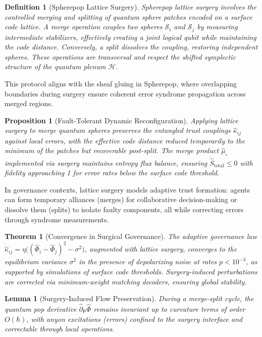 \documentclass[12pt]{article}
\newtheorem{definition}{Definition}
\newtheorem{proposition}{Proposition}
\newtheorem{lemma}{Lemma}
\newtheorem{theorem}{Theorem}
\begin{document}
\begin{definition}[Spherepop Lattice Surgery]
\emph{Spherepop lattice surgery} involves the controlled merging and splitting of quantum sphere patches encoded on a surface code lattice. A merge operation couples two spheres \(\mathcal{S}_i\) and \(\mathcal{S}_j\) by measuring intermediate stabilizers, effectively creating a joint logical qubit while maintaining the code distance. Conversely, a split dissolves the coupling, restoring independent spheres. These operations are transversal and respect the shifted symplectic structure of the quantum plenum \(\mathcal{H}\).
\end{definition}

This protocol aligns with the sheaf gluing in Spherepop, where overlapping boundaries during surgery ensure coherent error syndrome propagation across merged regions.

\begin{proposition}[Fault-Tolerant Dynamic Reconfiguration]
Applying lattice surgery to merge quantum spheres preserves the entangled trust couplings \(\hat{\kappa}_{ij}\) against local errors, with the effective code distance reduced temporarily to the minimum of the patches but recoverable post-split. The merge product \(\hat{\mu}_{\circ}\) implemented via surgery maintains entropy flux balance, ensuring \(\dot{\hat{S}}_{\text{total}} \leq 0\) with fidelity approaching 1 for error rates below the surface code threshold.
\end{proposition}

In governance contexts, lattice surgery models adaptive trust formation: agents can form temporary alliances (merges) for collaborative decision-making or dissolve them (splits) to isolate faulty components, all while correcting errors through syndrome measurements.

\begin{theorem}[Convergence in Surgical Governance]
The adaptive governance law \(\dot{\hat{\kappa}}_{ij} = \eta \big( (\hat{\Phi}_i - \hat{\Phi}_j)^2 - \sigma^2 \big)\), augmented with lattice surgery, converges to the equilibrium variance \(\sigma^2\) in the presence of depolarizing noise at rates \(p < 10^{-3}\), as supported by simulations of surface code thresholds. Surgery-induced perturbations are corrected via minimum-weight matching decoders, ensuring global stability.
\end{theorem}

\begin{lemma}[Surgery-Induced Flow Preservation]
During a merge-split cycle, the quantum pop derivative \(\hat{\partial}_{\mathsf{P}} \hat{\Phi}\) remains invariant up to curvature terms of order \(O(\hbar)\), with anyon excitations (errors) confined to the surgery interface and correctable through local operations.
\end{lemma}
\end{document}
